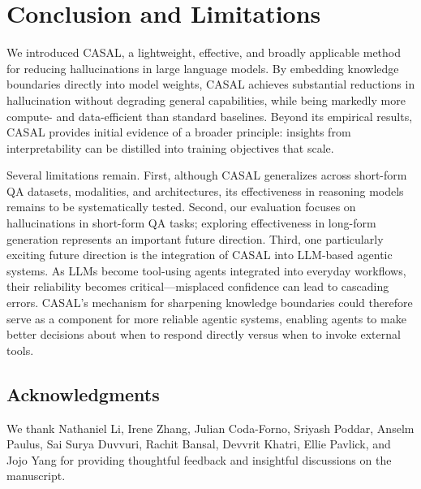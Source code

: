 \section{Conclusion and Limitations}

We introduced CASAL, a lightweight, effective, and broadly applicable method for reducing hallucinations in large language models. By embedding knowledge boundaries directly into model weights, CASAL achieves substantial reductions in hallucination without degrading general capabilities, while being markedly more compute- and data-efficient than standard baselines. Beyond its empirical results, CASAL provides initial evidence of a broader principle: insights from interpretability can be distilled into training objectives that scale.

Several limitations remain. First, although CASAL generalizes across short-form QA datasets, modalities, and architectures, its effectiveness in reasoning models remains to be systematically tested. Second, our evaluation focuses on hallucinations in short-form QA tasks; exploring effectiveness in long-form generation represents an important future direction. Third, one particularly exciting future direction is the integration of CASAL into LLM-based agentic systems. As LLMs become tool-using agents integrated into everyday workflows, their reliability becomes critical---misplaced confidence can lead to cascading errors. CASAL's mechanism for sharpening knowledge boundaries could therefore serve as a component for more reliable agentic systems, enabling agents to make better decisions about when to respond directly versus when to invoke external tools.

\subsection*{Acknowledgments}

We thank Nathaniel Li, Irene Zhang, Julian Coda-Forno, Sriyash Poddar, Anselm Paulus, Sai Surya Duvvuri, Rachit Bansal, Devvrit Khatri, Ellie Pavlick, and Jojo Yang for providing thoughtful feedback and insightful discussions on the manuscript.
